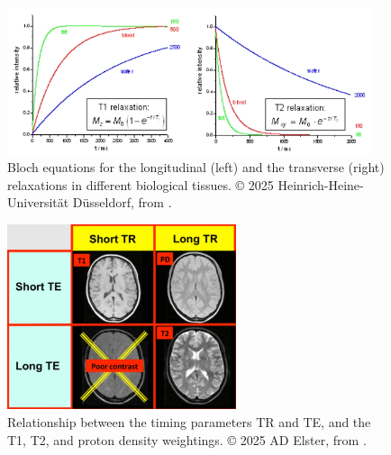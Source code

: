 \begin{figure}[htbp]
    \centering
    \includegraphics[width=0.95\textwidth]{figures/relaxation_plots.jpeg}
    \caption{Bloch equations for the longitudinal (left) and the transverse (right) relaxations in different biological tissues. © 2025 Heinrich-Heine-Universität Düsseldorf, from \cite{hhu}.}
    \label{fig:relaxation_plots}
\end{figure}

\begin{figure}[htbp]
    \centering
    \includegraphics[width=0.6\textwidth]{figures/weightings.jpeg}
    \caption{Relationship between the timing parameters TR and TE, and the T1, T2, and proton density weightings. © 2025 AD Elster, from \cite{mri_questions}.}
    \label{fig:weightings}
\end{figure}

